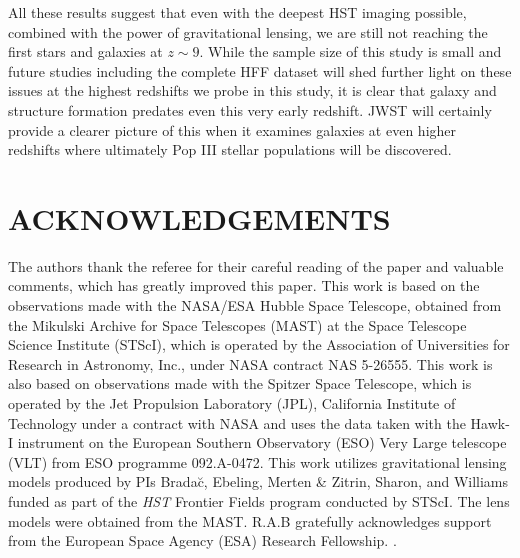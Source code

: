 \documentclass[twocolumn]{aastex63}
\begin{document}
All these results suggest that even with the deepest HST imaging possible, combined with the power of gravitational lensing, we are still not reaching the first stars and galaxies at $z\sim9$. While the sample size of this study is small and future studies including the complete HFF dataset will shed further light on these issues at the highest redshifts we probe in this study, it is clear that galaxy and structure formation predates even this very early redshift. JWST will certainly provide a clearer picture of this when it examines galaxies at even higher redshifts where ultimately Pop III stellar populations will be discovered.

   
\section{ACKNOWLEDGEMENTS}
The authors thank the referee for their careful reading of the paper and valuable comments, which has greatly improved this paper. This work is based on the observations made with the NASA/ESA Hubble Space Telescope, obtained from the Mikulski Archive for Space Telescopes (MAST) at the Space Telescope Science Institute (STScI), which is operated by the Association of Universities for Research in Astronomy, Inc., under NASA contract NAS 5-26555. This work is also based on observations made with the Spitzer Space Telescope, which is operated by the Jet Propulsion Laboratory (JPL), California Institute of Technology under a contract with NASA and uses the data taken with the Hawk-I instrument on the European Southern Observatory (ESO) Very Large telescope (VLT) from ESO programme 092.A-0472. This work utilizes gravitational lensing models produced by PIs Brada\u{c}, Ebeling, Merten \& Zitrin, Sharon, and Williams funded as part of the \textit{HST} Frontier Fields program conducted by STScI. The lens models were obtained from the MAST. R.A.B gratefully acknowledges support from the European Space Agency (ESA) Research Fellowship.
.


{}

\end{document}
